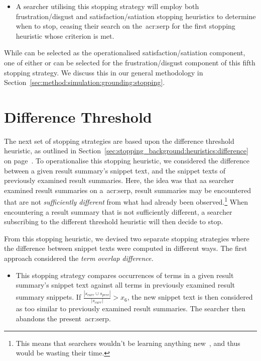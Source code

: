 \begin{itemize}
    \item{ A searcher utilising this stopping strategy will employ both frustration/disgust and satisfaction/satiation stopping heuristics to determine when to stop, ceasing their search on the~\gls{acr:serp} for the first stopping heuristic whose criterion is met.}
\end{itemize}

While  can be selected as the operationalised satisfaction/satiation component, one of either  or  can be selected for the frustration/disgust component of this fifth stopping strategy. We discuss this in our general methodology in Section~\ref{sec:method:simulation:grounding:stopping}.

\section{Difference Threshold}
The next set of stopping strategies are based upon the difference threshold heuristic, as outlined in Section~\ref{sec:stopping_background:heuristics:difference} on page~\pageref{sec:stopping_background:heuristics:difference}. To operationalise this stopping heuristic, we considered the difference between a given result summary's snippet text, and the snippet texts of previously examined result summaries. Here, the idea was that aa searcher examined result summaries on a~\gls{acr:serp}, result summaries may be encountered that are not \emph{sufficiently different} from what had already been observed.\footnote{This means that searchers wouldn't be learning anything new~\citep{nickles1995judgment}, and thus would be wasting their time.} When encountering a result summary that is not sufficiently different, a searcher subscribing to the different threshold heuristic will then decide to stop.

From this stopping heuristic, we devised two separate stopping strategies where the difference between snippet texts were computed in different ways. The first approach considered the \emph{term overlap difference.}

\begin{itemize}
    \item{ This stopping strategy compares occurrences of terms in a given result summary's snippet text against all terms in previously examined result summary snippets. If $\frac{|s_{curr} \cup s_{prev}|}{|s_{curr}|} > x_6$, the new snippet text is then considered as too similar to previously examined result summaries. The searcher then abandons the present~\gls{acr:serp}.}
\end{itemize}

